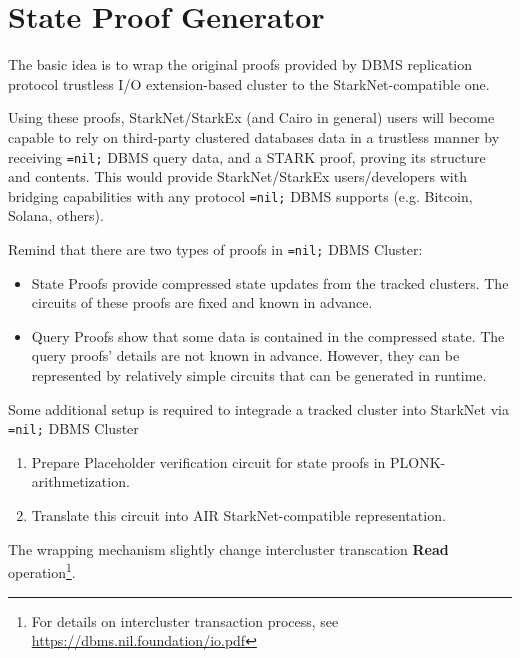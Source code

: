 \chapter{State Proof Generator}
\label{section:system}

The basic idea is to wrap the original proofs provided by DBMS replication 
protocol trustless I/O extension-based cluster to the StarkNet-compatible one. 

Using these proofs, StarkNet/StarkEx (and Cairo in general) users will become 
capable to rely on third-party clustered databases data in a trustless manner by 
receiving \texttt{=nil;} DBMS query data, and a STARK proof, proving its structure 
and contents. This would provide StarkNet/StarkEx users/developers with bridging
capabilities with any protocol \texttt{=nil;} DBMS supports (e.g. Bitcoin, Solana, others).

Remind that there are two types of proofs in \texttt{=nil;} DBMS Cluster:
\begin{itemize}
    \item State Proofs provide compressed state updates from the tracked clusters.
            The circuits of these proofs are fixed and known in advance.
    \item Query Proofs show that some data is contained in the compressed state.
            The query proofs' details are not known in advance.
            However, they can be represented by relatively simple circuits that can be 
            generated in runtime.
\end{itemize}

Some additional setup is required 
to integrade a tracked cluster into StarkNet via \texttt{=nil;} DBMS Cluster
\begin{enumerate}
    \item Prepare Placeholder verification circuit for state proofs in PLONK-arithmetization.
    \item Translate this circuit into AIR StarkNet-compatible representation. 
\end{enumerate}

The wrapping mechanism slightly change intercluster transcation \textbf{Read} operation\footnote{
    For details on intercluster transaction process, see 
    \url{https://dbms.nil.foundation/io.pdf}}.

